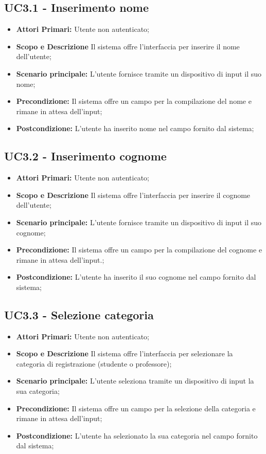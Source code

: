 \documentclass[AnalisiDeiRequisiti.tex]{subfiles}
\begin{document}
\subsection{UC3.1 - Inserimento nome}
\begin{itemize}
	\item \textbf{Attori Primari:} Utente non autenticato;
	\item \textbf{Scopo e Descrizione} Il sistema offre l'interfaccia per inserire il nome dell'utente;
	\item \textbf{Scenario principale:} L'utente fornisce tramite un dispositivo di input il suo nome;
	\item \textbf{Precondizione:} Il sistema offre un campo per la compilazione del nome e rimane in attesa dell'input;
	\item \textbf{Postcondizione:} L'utente ha inserito nome nel campo fornito dal sistema;
\end{itemize}	
\subsection{UC3.2 - Inserimento cognome}
\begin{itemize}
	\item \textbf{Attori Primari:} Utente non autenticato;
	\item \textbf{Scopo e Descrizione} Il sistema offre l'interfaccia per inserire il cognome dell'utente;
	\item \textbf{Scenario principale:} L'utente fornisce tramite un dispositivo di input il suo cognome;
	\item \textbf{Precondizione:} Il sistema offre un campo per la compilazione del cognome e rimane in attesa dell'input.;
	\item \textbf{Postcondizione:} L'utente ha inserito il suo cognome nel campo fornito dal sistema;
\end{itemize}
\subsection{UC3.3 - Selezione categoria}
\begin{itemize}
	\item \textbf{Attori Primari:} Utente non autenticato;
	\item \textbf{Scopo e Descrizione} Il sistema offre l'interfaccia per selezionare la categoria di registrazione (studente o professore);
	\item \textbf{Scenario principale:} L'utente seleziona tramite un dispositivo di input la sua categoria;
	\item \textbf{Precondizione:} Il sistema offre un campo per la selezione della categoria e rimane in attesa dell'input;
	\item \textbf{Postcondizione:} L'utente ha selezionato la sua categoria nel campo fornito dal sistema;
\end{itemize}
\end{document}
